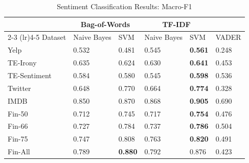 \begin{table}
\caption{Sentiment Classification Results: Macro-F1}
\label{tab:sentiment_f1}
\begin{tabularx}{\linewidth}{lXXXXX}
\toprule
 & \multicolumn{2}{c}{Bag-of-Words} & \multicolumn{2}{c}{TF-IDF} & \\
\cmidrule(lr){2-3} \cmidrule(lr){4-5}
Dataset & Naive Bayes & SVM & Naive Bayes & SVM & VADER \\
\midrule
Yelp & 0.532 & 0.481 & 0.545 & \textbf{0.561} & 0.248 \\
TE-Irony & 0.635 & 0.624 & 0.630 & \textbf{0.641} & 0.453 \\
TE-Sentiment & 0.584 & 0.580 & 0.545 & \textbf{0.598} & 0.536 \\
Twitter & 0.648 & 0.770 & 0.664 & \textbf{0.774} & 0.328 \\
IMDB & 0.850 & 0.870 & 0.868 & \textbf{0.905} & 0.690 \\
Fin-50 & 0.712 & 0.745 & 0.717 & \textbf{0.754} & 0.476 \\
Fin-66 & 0.727 & 0.784 & 0.737 & \textbf{0.786} & 0.504 \\
Fin-75 & 0.747 & 0.808 & 0.763 & \textbf{0.820} & 0.491 \\
Fin-All & 0.789 & \textbf{0.880} & 0.792 & 0.876 & 0.423 \\
\bottomrule
\end{tabularx}
\end{table}
